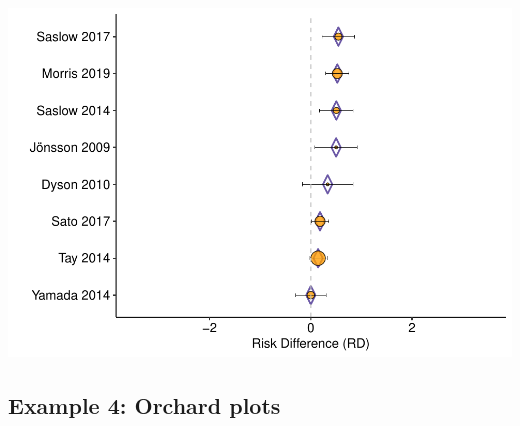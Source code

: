 \documentclass[
]{book}
\begin{document}
\includegraphics{_main_files/figure-latex/unnamed-chunk-31-1.pdf}

\subsection{Example 4: Orchard plots}\label{example-4-orchard-plots}
\end{document}
